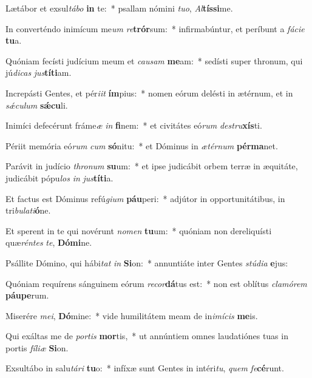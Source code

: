 \item Lætábor et exsul\textit{tá}\textit{bo} \textbf{in} te:~* psallam nómini \textit{tu}\textit{o}, \textit{Al}\textbf{tís}\textbf{si}me.
\item In converténdo inimícum me\textit{um} \textit{re}\textbf{trór}sum:~* infirmabúntur, et períbunt a \textit{fá}\textit{ci}\textit{e} \textbf{tu}a.
\item Quóniam fecísti judícium meum et \textit{cau}\textit{sam} \textbf{me}am:~* sedísti super thronum, qui jú\textit{di}\textit{cas} \textit{jus}\textbf{tí}\textbf{ti}am.
\item Increpásti Gentes, et pér\textit{i}\textit{it} \textbf{ím}pius:~* nomen eórum delésti in ætérnum, et in \textit{sǽ}\textit{cu}\textit{lum} \textbf{sǽ}\textbf{cu}li.
\item Inimíci defecérunt fráme\textit{æ} \textit{in} \textbf{fi}nem:~* et civitátes eó\textit{rum} \textit{de}\textit{stru}\textbf{xís}ti.
\item Périit memória eó\textit{rum} \textit{cum} \textbf{só}nitu:~* et Dóminus in \textit{æ}\textit{tér}\textit{num} \textbf{pér}\textbf{ma}net.
\item Parávit in judício \textit{thro}\textit{num} \textbf{su}um:~* et ipse judicábit orbem terræ in æquitáte, judicábit pópu\textit{los} \textit{in} \textit{jus}\textbf{tí}\textbf{ti}a.
\item Et factus est Dóminus refú\textit{gi}\textit{um} \textbf{páu}peri:~* adjútor in opportunitátibus, in tri\textit{bu}\textit{la}\textit{ti}\textbf{ó}ne.
\item Et sperent in te qui novérunt \textit{no}\textit{men} \textbf{tu}um:~* quóniam non dereliquísti quæ\textit{rén}\textit{tes} \textit{te}, \textbf{Dó}\textbf{mi}ne.
\item Psállite Dómino, qui hábi\textit{tat} \textit{in} \textbf{Si}on:~* annuntiáte inter Gentes \textit{stú}\textit{di}\textit{a} \textbf{e}jus:
\item Quóniam requírens sánguinem eórum \textit{re}\textit{cor}\textbf{dá}tus est:~* non est oblítus \textit{cla}\textit{mó}\textit{rem} \textbf{páu}\textbf{pe}rum.
\item Miserére \textit{me}\textit{i}, \textbf{Dó}mine:~* vide humilitátem meam de in\textit{i}\textit{mí}\textit{cis} \textbf{me}is.
\item Qui exáltas me de \textit{por}\textit{tis} \textbf{mor}tis,~* ut annúntiem omnes laudatiónes tuas in portis \textit{fí}\textit{li}\textit{æ} \textbf{Si}on.
\item Exsultábo in salu\textit{tá}\textit{ri} \textbf{tu}o:~* infíxæ sunt Gentes in intéri\textit{tu}, \textit{quem} \textit{fe}\textbf{cé}runt.
